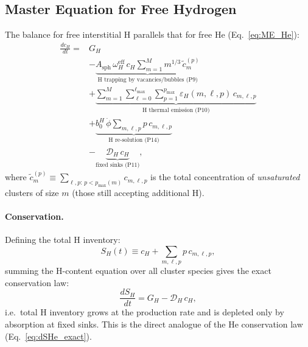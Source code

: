 \documentclass[pdflatex,sn-basic]{sn-jnl} %
\begin{document}
\subsection{Master Equation for Free Hydrogen}
\label{sec:ME_H}

The balance for free interstitial H parallels that for free He
(Eq.~\ref{eq:ME_He}):
\begin{equation}\label{eq:ME_H}
\boxed{
\begin{split}
\frac{dc_H}{dt} = {} &
    G_H
    \\
    &- \underbrace{
       A_{\mathrm{sph}}\,\omega_H^{\mathrm{eff}}\,c_H
       \sum_{m=1}^{M} m^{1/3}\,\tilde{c}_m^{(p)}
       }_{\text{H trapping by vacancies/bubbles (P9)}}
    \\
    &+ \underbrace{
       \sum_{m=1}^{M}\sum_{\ell=0}^{\ell_{\max}}\sum_{p=1}^{p_{\max}}
       \varepsilon_H(m,\ell,p)\,c_{m,\ell,p}
       }_{\text{H thermal emission (P10)}}
    \\
    &+ \underbrace{
       b_0^H\,\dot{\phi}\sum_{m,\ell,p} p\,c_{m,\ell,p}
       }_{\text{H re-solution (P14)}}
    \\
    &- \underbrace{
       \mathcal{D}_H\,c_H
       }_{\text{fixed sinks (P11)}},
\end{split}
}
\end{equation}
where $\tilde{c}_m^{(p)} \equiv \sum_{\ell,p:\,p < p_{\max}(m)} c_{m,\ell,p}$
is the total concentration of \emph{unsaturated} clusters of size $m$
(those still accepting additional H).

\paragraph{Conservation.}
Defining the total H inventory:
\begin{equation}\label{eq:SH}
    S_H(t) \equiv c_H + \sum_{m,\ell,p} p\,c_{m,\ell,p},
\end{equation}
summing the H-content equation over all cluster species gives the exact
conservation law:
\begin{equation}\label{eq:dSH}
    \frac{dS_H}{dt} = G_H - \mathcal{D}_H\,c_H,
\end{equation}
i.e.\ total H inventory grows at the production rate and is depleted
only by absorption at fixed sinks.  This is the direct analogue of the
He conservation law (Eq.~\ref{eq:dSHe_exact}).

\end{document}
